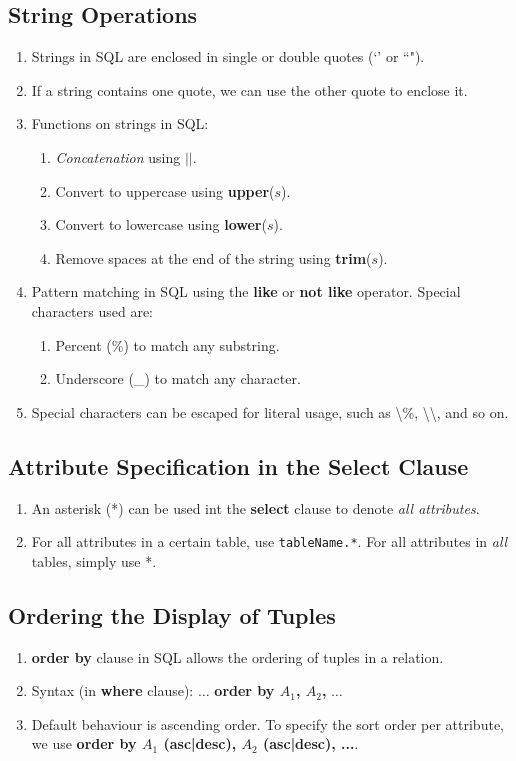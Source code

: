 \documentclass[journal,12pt,twocolumn]{IEEEtran}
\begin{document}
\subsection{String Operations}
\begin{enumerate}
    \item Strings in SQL are enclosed in single or double quotes (`' or ``").
    \item If a string contains one quote, we can use the other quote to enclose 
    it.
    \item Functions on strings in SQL:
    \begin{enumerate}
        \item \textit{Concatenation} using $||$.
        \item Convert to uppercase using \textbf{upper}($s$).
        \item Convert to lowercase using \textbf{lower}($s$).
        \item Remove spaces at the end of the string using \textbf{trim}($s$).
    \end{enumerate}
    \item Pattern matching in SQL using the \textbf{like} or \textbf{not like} 
    operator. Special characters used are:
    \begin{enumerate}
        \item Percent (\%) to match any substring.
        \item Underscore (\_) to match any character.
    \end{enumerate}
    \item Special characters can be escaped for literal usage, such as 
    \textbackslash\%, \textbackslash\textbackslash, and so on.
\end{enumerate}

\subsection{Attribute Specification in the Select Clause}
\begin{enumerate}
    \item An asterisk (*) can be used int the \textbf{select} clause to denote 
    \textit{all attributes}.
    \item For all attributes in a certain table, use \texttt{tableName.*}. For
    all attributes in \textit{all} tables, simply use *.
\end{enumerate}

\subsection{Ordering the Display of Tuples}
\begin{enumerate}
    \item \textbf{order by} clause in SQL allows the ordering of tuples in a 
    relation.
    \item Syntax (in \textbf{where} clause): $\ldots$ \textbf{order by $A_1$, 
    $A_2$,} $\ldots$ 
    \item Default behaviour is ascending order. To specify the sort order per 
    attribute, we use \textbf{order by $A_1$ (asc|desc), $A_2$ (asc|desc), ...}.
\end{enumerate}
\end{document}
